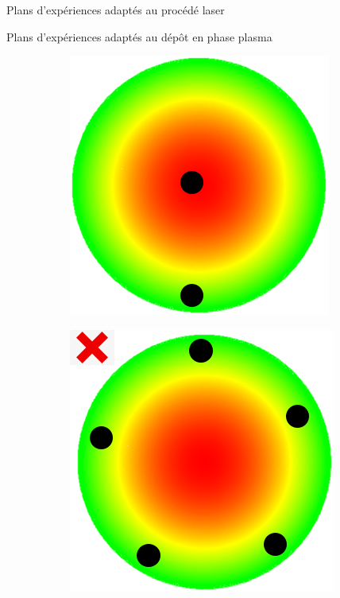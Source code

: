 \documentclass[10pt]{beamer}
\begin{document}
\begin{frame}
\begin{block}{Plans d'expériences adaptés au procédé laser}
\begin{figure}[H]
\end{figure}
\end{block} \pause

 
 \begin{block}{Plans d'expériences adaptés au dépôt en phase plasma}
\begin{figure}[H] 
\begin{subfigure}[l]{0.2\textwidth}
\centering
\includegraphics[width=\textwidth, height=\textwidth]{figures/doea.png}
\label{fige}
\end{subfigure}%
\hspace{0.05\textwidth}
\begin{subfigure}[l]{0.2\textwidth}
\centering 
\includegraphics[width=\textwidth, height=\textwidth]{figures/doeb.png}

\end{subfigure}
\end{figure}
\end{block}
\end{frame}
\end{document}
